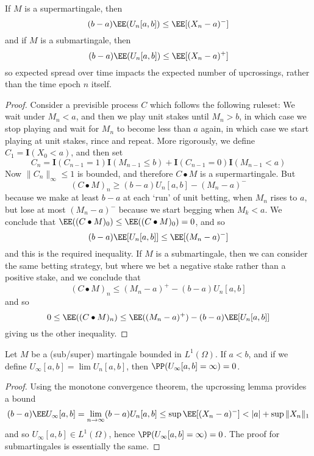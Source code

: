 \begin{theorem}
    If $M$ is a supermartingale, then
    \[ (b-a) \EE(U_n[a,b]) \leq \EE[(X_n - a)^-] \]
    and if $M$ is a submartingale, then
    \[ (b-a) \EE(U_n[a,b]) \leq \EE[(X_n - a)^+] \]
    so expected spread over time impacts the expected number of upcrossings, rather than the time epoch $n$ itself.
\end{theorem}
\begin{proof}
    Consider a previsible process $C$ which follows the following ruleset: We wait under $M_n < a$, and then we play unit stakes until $M_n > b$, in which case we stop playing and wait for $M_n$ to become less than $a$ again, in which case we start playing at unit stakes, rince and repeat. More rigorously, we define $C_1 = \mathbf{I}(X_0 < a)$, and then set
    \[ C_n = \mathbf{I}(C_{n-1} = 1) \mathbf{I}(M_{n-1} \leq b) + \mathbf{I}(C_{n-1} = 0) \mathbf{I}(M_{n-1} < a) \]
    Now $\| C_n \|_\infty \leq 1$ is bounded, and therefore $C \bullet M$ is a supermartingale. But
    \[ (C \bullet M)_n \geq (b-a) U_n[a,b] - (M_n - a)^- \]
    because we make at least $b-a$ at each `run' of unit betting, when $M_n$ rises to $a$, but lose at most $(M_n - a)^-$ because we start begging when $M_k < a$. We conclude that $\EE((C \bullet M)_0) \leq \EE((C \bullet M)_0) = 0$, and so
    \[ (b-a) \EE[U_n[a,b]] \leq \EE[(M_n - a)^-] \]
    and this is the required inequality. If $M$ is a submartingale, then we can consider the same betting strategy, but where we bet a negative stake rather than a positive stake, and we conclude that
    \[ (C \bullet M)_n \leq (M_n - a)^+ -(b-a) U_n[a,b] \]
    and so
    \[ 0 \leq \EE((C \bullet M)_n) \leq \EE((M_n - a)^+) - (b-a) \EE[U_n[a,b]] \]
    giving us the other inequality.
\end{proof}

\begin{corollary}
    Let $M$ be a (sub/super) martingale bounded in $L^1(\Omega)$. If $a < b$, and if we define $U_\infty[a,b] = \lim U_n[a,b]$, then $\PP(U_\infty[a,b] = \infty) = 0$.
\end{corollary}
\begin{proof}
    Using the monotone convergence theorem, the upcrossing lemma provides a bound
    \[ (b - a) \EE U_\infty [a,b] = \lim_{n \to \infty} (b-a) U_n[a,b] \leq \sup \EE[(X_n - a)^-] < |a| + \sup \| X_n \|_1 \]
    and so $U_\infty[a,b] \in L^1(\Omega)$, hence $\PP(U_\infty[a,b] = \infty) = 0$. The proof for submartingales is essentially the same.
\end{proof}

